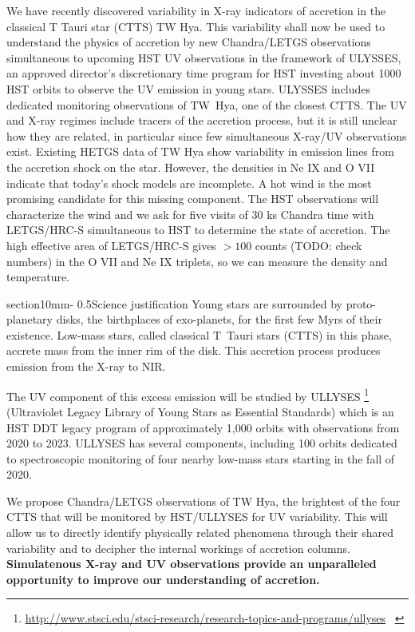 \documentclass[letterpaper,11pt,twocolumn]{article}
\makeatletter
\renewcommand{\section}{\@startsection%
{section}{1}{0mm}{-\baselineskip}%
{0.5\baselineskip}{\normalfont\Large\bfseries}}%
\makeatother
\begin{document}
We have recently discovered variability in X-ray indicators of
accretion in the classical T Tauri star (CTTS) TW Hya. This
variability shall now be used to understand the physics of accretion
by new Chandra/LETGS observations simultaneous to upcoming HST UV
observations in the framework of ULYSSES, an approved director's
discretionary time program for HST investing about 1000 HST
orbits to observe the UV emission in young stars. ULYSSES
includes dedicated monitoring observations of TW~Hya, one of the closest
CTTS. The UV and X-ray regimes include tracers of the accretion
process, but it is still unclear how they are related, in particular
since few simultaneous X-ray/UV observations exist. Existing HETGS
data of TW Hya show variability in emission lines from the accretion
shock on the star. However, the densities in Ne IX and O VII indicate
that today's shock models are incomplete. A hot wind is the most
promising candidate for this missing component. The HST observations
will characterize the wind and we ask for five visits of 30 ks Chandra
time with LETGS/HRC-S simultaneous to HST to determine the state of
accretion. The high effective area of LETGS/HRC-S gives $> 100$ counts
(TODO: check numbers) in the O VII and Ne IX triplets, so we can
measure the density and temperature.


\section{Science justification}
Young stars are surrounded by proto-planetary disks, the birthplaces of exo-planets, for the first few Myrs of their existence. Low-mass stars, called classical T~Tauri stars (CTTS) in this phase, accrete mass from the inner rim of the disk. This accretion process produces emission from the X-ray to NIR.

The UV component of this excess emission will be studied by ULLYSES \footnote{\url{http://www.stsci.edu/stsci-research/research-topics-and-programs/ullyses} ~}
(Ultraviolet Legacy Library of Young Stars as Essential Standards) which is an HST DDT legacy program of  approximately 1,000 orbits with observations from 2020 to 2023. ULLYSES has several components, including 100 orbits dedicated to spectroscopic monitoring of four nearby low-mass stars  starting in the fall of 2020.

We propose Chandra/LETGS observations of TW Hya, the brightest of the four  CTTS that will be monitored by HST/ULLYSES for UV variability.
This will allow us to directly identify physically related phenomena through
their shared variability and to decipher the internal workings of accretion columns.  {\bf Simulatenous X-ray and UV
observations provide an unparalleled opportunity to improve
our understanding of accretion.}
\end{document}
